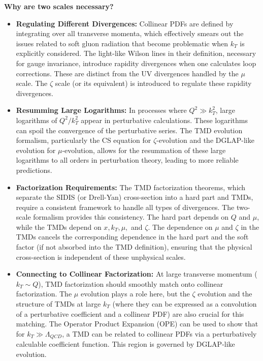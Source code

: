 \documentclass[11pt]{article}
\begin{document}
\textbf{Why are two scales necessary?}
\begin{itemize}
  \item \textbf{Regulating Different Divergences:} Collinear PDFs are defined by integrating over all transverse momenta, which effectively smears out the issues related to soft gluon radiation that become problematic when $k_T$ is explicitly considered. The light-like Wilson lines in their definition, necessary for gauge invariance, introduce rapidity divergences when one calculates loop corrections. These are distinct from the UV divergences handled by the $\mu$ scale. The $\zeta$ scale (or its equivalent) is introduced to regulate these rapidity divergences.
  \item \textbf{Resumming Large Logarithms:} In processes where $Q^2 \gg k_T^2$, large logarithms of $Q^2/k_T^2$ appear in perturbative calculations. These logarithms can spoil the convergence of the perturbative series. The TMD evolution formalism, particularly the CS equation for $\zeta$-evolution and the DGLAP-like evolution for $\mu$-evolution, allows for the resummation of these large logarithms to all orders in perturbation theory, leading to more reliable predictions.
  \item \textbf{Factorization Requirements:} The TMD factorization theorems, which separate the SIDIS (or Drell-Yan) cross-section into a hard part and TMDs, require a consistent framework to handle all types of divergences. The two-scale formalism provides this consistency. The hard part depends on $Q$ and $\mu$, while the TMDs depend on $x, k_T, \mu,$ and $\zeta$. The dependence on $\mu$ and $\zeta$ in the TMDs cancels the corresponding dependence in the hard part and the soft factor (if not absorbed into the TMD definition), ensuring that the physical cross-section is independent of these unphysical scales.
  \item \textbf{Connecting to Collinear Factorization:} At large transverse momentum ($k_T \sim Q$), TMD factorization should smoothly match onto collinear factorization. The $\mu$ evolution plays a role here, but the $\zeta$ evolution and the structure of TMDs at large $k_T$ (where they can be expressed as a convolution of a perturbative coefficient and a collinear PDF) are also crucial for this matching. The Operator Product Expansion (OPE) can be used to show that for $k_T \gg \Lambda_{QCD}$, a TMD can be related to collinear PDFs via a perturbatively calculable coefficient function. This region is governed by DGLAP-like evolution.
\end{itemize}
\end{document}
